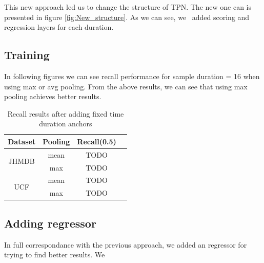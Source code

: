 \documentclass{report}
\begin{document}
This new approach led us to change the structure of TPN. The new one can is presented in figure \ref{fig:New_structure}. As we can see, we \
added scoring and regression layers for each duration.

\subsection{Training}
In following figures we can see recall performance for sample duration = 16 when using max or avg pooling. 
From the above results, we can see that using max pooling achieves better results.

\begin{table}[h]
  \centering
  \begin{tabular}{||c | c | c | c ||}
    \hline
    \textbf{Dataset} & \textbf{Pooling} &  \textbf{Recall(0.5)} \\
    \hline  \hline
    \multirow{2}{4em}{JHMDB} & mean &  TODO \\
    \cline{2-3}
    {} & max & TODO \\
    \hline
    \multirow{2}{4em}{UCF} & mean &  TODO \\
    \cline{2-3}
    {} & max & TODO \\
    \hline
  \end{tabular}
  \caption{Recall results after adding fixed time duration anchors}
  \label{table:tpn_2_1}
\end{table}

\subsection{Adding regressor}
In full correspondance with the previous approach, we added an regressor for trying to find better results. We 
\end{document}
